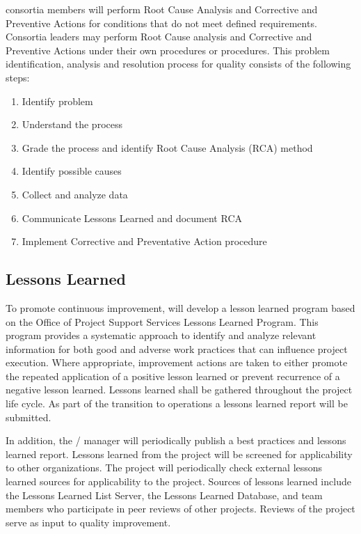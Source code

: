 consortia members will perform Root Cause Analysis and
Corrective and Preventive Actions for conditions that do not meet
defined requirements. Consortia leaders may perform Root Cause
analysis and Corrective and Preventive Actions under their own
procedures or \fnal procedures.  This problem identification, analysis
and resolution process for quality consists of the following steps:
\begin{enumerate}
  \item Identify problem
  \item Understand the process
  \item Grade the process and identify Root Cause Analysis (RCA)
    method
  \item Identify possible causes
  \item Collect and analyze data
  \item Communicate Lessons Learned and document RCA
  \item Implement Corrective and Preventative Action procedure
\end{enumerate}

\subsection{Lessons Learned}
\label{sec:lessons_learned}

To promote continuous improvement,   will develop a
lesson learned program based on the \fnal Office of Project Support
Services Lessons Learned Program. This program provides a systematic
approach to identify and analyze relevant information for both good
and adverse work practices that can influence project execution. Where
appropriate, improvement actions are taken to either promote the
repeated application of a positive lesson learned or prevent
recurrence of a negative lesson learned. Lessons learned shall be
gathered throughout the project life cycle. As part of the transition
to operations a lessons learned report will be submitted.

In addition, the /  manager will
periodically publish a best practices and lessons learned
report. Lessons learned from the  project will be screened
for applicability to other organizations. The  project
will periodically check external lessons learned sources for
applicability to the  project. Sources of lessons learned
include the  Lessons Learned List Server, the \fnal {}
Lessons Learned Database, and  team members who
participate in peer reviews of other projects. Reviews of the
 project serve as input to quality improvement.

